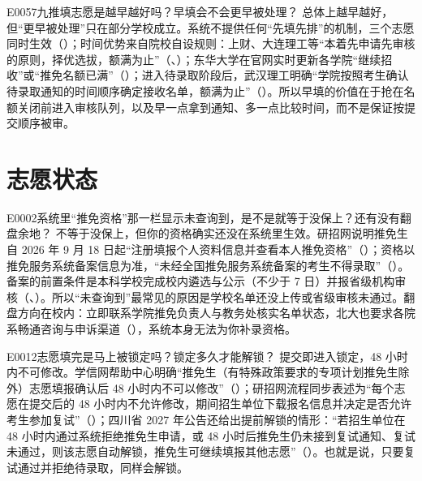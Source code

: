 \begin{qa}{E0057}{九推填志愿是越早越好吗？早填会不会更早被处理？}
总体上越早越好，但“更早被处理”只在部分学校成立。系统不提供任何“先填先排”的机制，三个志愿同时生效（）；时间优势来自院校自设规则：上财、大连理工等“本着先申请先审核的原则，择优选拔，额满为止”（、）；东华大学在官网实时更新各学院“继续招收”或“推免名额已满”（）；进入待录取阶段后，武汉理工明确“学院按照考生确认待录取通知的时间顺序确定接收名单，额满为止”（）。所以早填的价值在于抢在名额关闭前进入审核队列，以及早一点拿到通知、多一点比较时间，而不是保证按提交顺序被审。
\end{qa}

\section{志愿状态}
\begin{qa}{E0002}{系统里“推免资格”那一栏显示未查询到，是不是就等于没保上？还有没有翻盘余地？}
不等于没保上，但你的资格确实还没在系统里生效。研招网说明推免生自 2026 年 9 月 18 日起“注册填报个人资料信息并查看本人推免资格”（）；资格以推免服务系统备案信息为准，“未经全国推免服务系统备案的考生不得录取”（）。备案的前置条件是本科学校完成校内遴选与公示（不少于 7 日）并报省级机构审核（、）。所以“未查询到”最常见的原因是学校名单还没上传或省级审核未通过。翻盘方向在校内：立即联系学院推免负责人与教务处核实名单状态，北大也要求各院系畅通咨询与申诉渠道（），系统本身无法为你补录资格。
\end{qa}

\begin{qa}{E0012}{志愿填完是马上被锁定吗？锁定多久才能解锁？}
提交即进入锁定，48 小时内不可修改。学信网帮助中心明确“推免生（有特殊政策要求的专项计划推免生除外）志愿填报确认后 48 小时内不可以修改”（）；研招网流程同步表述为“每个志愿在提交后的 48 小时内不允许修改，期间招生单位下载报名信息并决定是否允许考生参加复试”（）；四川省 2027 年公告还给出提前解锁的情形：“若招生单位在 48 小时内通过系统拒绝推免生申请，或 48 小时后推免生仍未接到复试通知、复试未通过，则该志愿自动解锁，推免生可继续填报其他志愿”（）。也就是说，只要复试通过并拒绝待录取，同样会解锁。
\end{qa}

